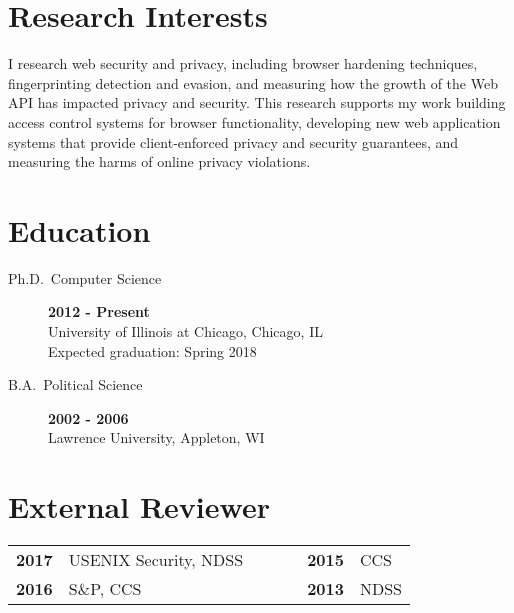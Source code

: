 \documentclass[wideaddress]{vitae}
\author{Peter Snyder}
\begin{document}
  \maketitle

  \section{Research Interests}
  \begin{description}
      \item{\noindent I research web security and privacy, including browser
          hardening techniques, fingerprinting detection and evasion,
          and measuring how the growth of the Web API has impacted privacy and security.
          This research supports my work building access control systems for
          browser functionality, developing new web application systems
          that provide client-enforced privacy and security guarantees,
          and measuring the harms of online privacy violations.}
  \end{description}

  \section{Education}
  \begin{description}
    \item[Ph.D.~Computer Science] \hfill \textbf{2012 - Present}\\
    University of Illinois at Chicago, Chicago, IL\\
    Expected graduation: Spring 2018

    \item[B.A.~Political Science] \hfill \textbf{2002 - 2006}~\\
    Lawrence University, Appleton, WI
  \end{description}

  
    \nocite{snyder2017browser}
    \nocite{snyder2017doxing}
    \nocite{snyder2017cdf}
    \nocite{snyder2016browser}
    \nocite{snyder2016characterizing}
    \nocite{snyder2016phishing}
    \nocite{snyder2015no}
    \nocite{clark2015saw}
    \nocite{snyder2014yao}
    \nocite{snyder2014cloudsweeper}
    \nocite{snyder2013cloudsweeper}
  

  \section{External Reviewer}
  \begin{tabular}{lllllll}
    \textbf{2017} & USENIX Security, NDSS &&&& \textbf{2015} & CCS \\
    \textbf{2016} & S\&P, CCS             &&&& \textbf{2013} & NDSS \\
  \end{tabular}
\end{document}
